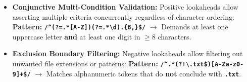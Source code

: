 \documentclass[10pt,a4paper]{article}
\newcommand{\rx}[1]{\texttt{\bfseries\color{inlinecode}#1}}
\begin{document}
\vspace{1pt}
\par\vspace{1pt}
\begin{itemize}[leftmargin=12pt, itemsep=1.5pt, parsep=0pt, topsep=1pt]
    \item \textbf{Conjunctive Multi-Condition Validation:} Positive lookaheads allow asserting multiple criteria concurrently regardless of character ordering:
    \newline \textbf{Pattern:} \rx{/\^{}(?=.*[A-Z])(?=.*\textbackslash d).\{8,\}\$/} $\longrightarrow$ Demands at least one uppercase letter \textbf{and} at least one digit in $\ge 8$ characters.
    \item \textbf{Exclusion Boundary Filtering:} Negative lookaheads allow filtering out unwanted file extensions or patterns:
    \newline \textbf{Pattern:} \rx{/\^{}.*(?!\textbackslash.txt\$)[A-Za-z0-9]+\$/} $\longrightarrow$ Matches alphanumeric tokens that do \textbf{not} conclude with \rx{.txt}.
\end{itemize}

\newpage


\par\vspace{1pt}
\end{document}
